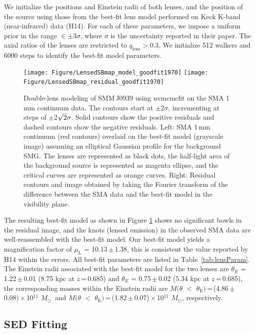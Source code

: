 \documentclass[twocolumn,apj,numberedappendix]{emulateapj}
\newcommand{\Msun}{\mbox{$M_{\odot}$}}
\begin{document}
We initialize the positions and Einstein radii of both lenses, and the position of the source using those
 from the best-fit lens model performed on Keck K-band (near-infrared) data (H14). For each of
these parameters, we impose a uniform prior in the range $\in\pm$3$\sigma$, where $\sigma$ is the uncertainty
reported in their paper. The axial ratios of the lenses are restricted to $q_\textrm{lens} > 0.3$. We initialize 512
walkers and 6000 steps to identify the best-fit model parameters.
\begin{figure}[!tbpH]
\centering
\texttt{[image: Figure/LensedSBmap\_model\_goodfit1970]}
\texttt{[image: Figure/LensedSBmap\_residual\_goodfit1970]}
\caption{Double-lens modeling of SMM\,J0939 using {\sc uvmcmcfit} on the SMA 1\,mm continuum data.
The contours start at $\pm$2$\sigma$, incrementing at
steps of $\pm$2$\sqrt{\rm 2}\sigma$. Solid contours show the positive residuals and dashed contours
show the negative residuals. 
Left: SMA 1\,mm continuum (red contours) overlaid on the best-fit model (grayscale image) assuming an elliptical Gaussian profile for the background SMG. The lenses are represented as black dots, the half-light area of the background source is represented as magenta ellipse, and the critical curves are represented as orange curves. 
Right: Residual contours and image obtained by taking the Fourier transform of the difference between the SMA data and the best-fit model in the visibility plane. \label{fig:lens}}
\end{figure}

The resulting best-fit model as shown in Figure\,\,\ref{fig:lens} shows no significant bowls in the residual
image, and the knots (lensed emission) in the observed SMA data are well-reassembled with the best-fit model.
Our best-fit model yields a magnification
factor of $\mu_\textrm{L}$ = 10.13\,$\pm$\,1.38, this is consistent the value reported by H14 within the errors. All best-fit
parameters are listed in Table~\ref{tab:lensParam}. The Einstein radii associated with the best-fit model for the two lenses are $\theta_{E}$ = 1.22\,$\pm$\,0.01 (8.75 kpc at $z$\,=\,0.685) and $\theta_{E}$ = 0.75\,$\pm$\,0.02 (5.34\,\,kpc at $z$\,=\,0.685),
the corresponding masses within the Einstein radii are $M(\theta$\,\,$<$\,\,$\theta_\textrm{E})$\,=\,(4.86\,$\pm$\,0.08)\,$\times$\,10$^{11}$\,\,\Msun\ and $M(\theta$\,\,$<$\,\,$\theta_\textrm{E})$\,=\,(1.82\,$\pm$\,0.07)\,$\times$\,10$^{11}$\,\,\Msun, respectively. 


\subsection{SED Fitting} \label{sec:SED}
\end{document}
